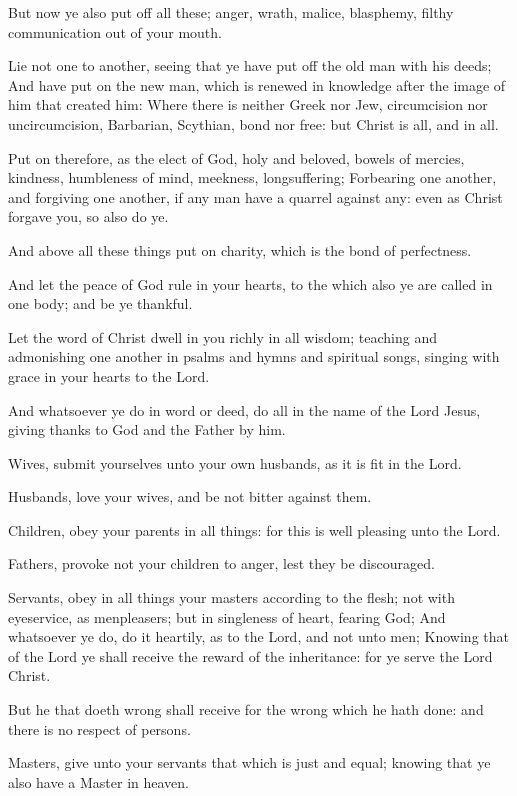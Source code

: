 \Verse But now ye also put off all these; anger, wrath, malice, blasphemy, filthy communication out of your mouth.

\Verse Lie not one to another, seeing that ye have put off the old man with his deeds; \Verse And have put on the new man, which is renewed in knowledge after the image of him that created him: \Verse Where there is neither Greek nor Jew, circumcision nor uncircumcision, Barbarian, Scythian, bond nor free: but Christ is all, and in all.

\Verse Put on therefore, as the elect of God, holy and beloved, bowels of mercies, kindness, humbleness of mind, meekness, longsuffering; \Verse Forbearing one another, and forgiving one another, if any man have a quarrel against any: even as Christ forgave you, so also do ye.

\Verse And above all these things put on charity, which is the bond of perfectness.

\Verse And let the peace of God rule in your hearts, to the which also ye are called in one body; and be ye thankful.

\Verse Let the word of Christ dwell in you richly in all wisdom; teaching and admonishing one another in psalms and hymns and spiritual songs, singing with grace in your hearts to the Lord.

\Verse And whatsoever ye do in word or deed, do all in the name of the Lord Jesus, giving thanks to God and the Father by him.

\Verse Wives, submit yourselves unto your own husbands, as it is fit in the Lord.

\Verse Husbands, love your wives, and be not bitter against them.

\Verse Children, obey your parents in all things: for this is well pleasing unto the Lord.

\Verse Fathers, provoke not your children to anger, lest they be discouraged.

\Verse Servants, obey in all things your masters according to the flesh; not with eyeservice, as menpleasers; but in singleness of heart, fearing God; \Verse And whatsoever ye do, do it heartily, as to the Lord, and not unto men; \Verse Knowing that of the Lord ye shall receive the reward of the inheritance: for ye serve the Lord Christ.

\Verse But he that doeth wrong shall receive for the wrong which he hath done: and there is no respect of persons.


\Chapter
\Verse Masters, give unto your servants that which is just and equal; knowing that ye also have a Master in heaven.

